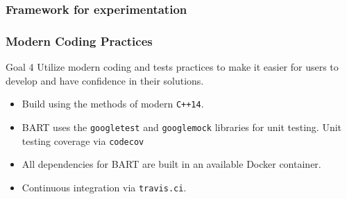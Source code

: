 \documentclass[xcolor=x11names, compress, handout]{beamer}
\begin{document}
\begin{frame}
  \frametitle{Framework for experimentation}
\end{frame}

\begin{frame}
  \frametitle{Modern Coding Practices}
  \begin{block}{Goal 4}
    Utilize modern coding and tests practices to make it
    easier for users to develop and have confidence in their solutions.
  \end{block}
  \begin{itemize}
  \item Build using the methods of modern \texttt{C++14}.
  \item BART uses the \texttt{googletest} and \texttt{googlemock}
    libraries for unit testing. Unit testing coverage via \texttt{codecov}
  \item All dependencies for BART are built in an available Docker
    container.
  \item Continuous integration via \texttt{travis.ci}.
  \end{itemize}  
    
\end{frame}
\end{document}
